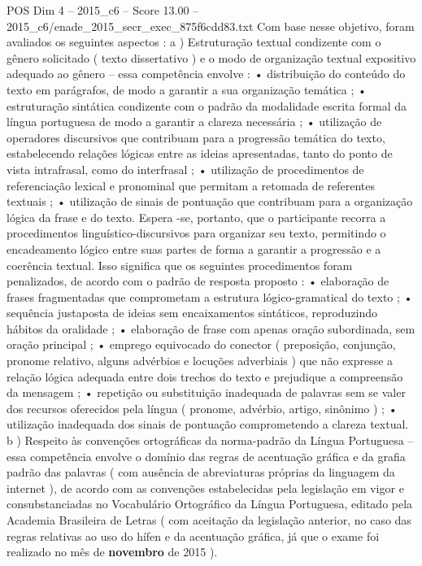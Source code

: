 \begin{textsample}{POS Dim 4 – 2015\_c6 – Score 13.00 – 2015\_c6/enade\_2015\_secr\_exec\_875f6cdd83.txt}
Com base nesse objetivo, foram avaliados os seguintes aspectos : a ) Estruturação textual condizente com o gênero solicitado ( texto dissertativo ) e o modo de organização textual expositivo adequado ao gênero – essa competência envolve : • distribuição do conteúdo do texto em parágrafos, de modo a garantir a sua organização temática ; • estruturação sintática condizente com o padrão da modalidade escrita formal da língua portuguesa de modo a garantir a clareza necessária ; • utilização de operadores discursivos que contribuam para a progressão temática do texto, estabelecendo relações lógicas entre as ideias apresentadas, tanto do ponto de vista intrafrasal, como do interfrasal ; • utilização de procedimentos de referenciação lexical e pronominal que permitam a retomada de referentes textuais ; • utilização de sinais de pontuação que contribuam para a organização lógica da frase e do texto.
Espera -se, portanto, que o participante recorra a procedimentos linguístico-discursivos para organizar seu texto, permitindo o encadeamento lógico entre suas partes de forma a garantir a progressão e a coerência textual.
Isso significa que os seguintes procedimentos foram penalizados, de acordo com o padrão de resposta proposto : • elaboração de frases fragmentadas que comprometam a estrutura lógico-gramatical do texto ; • sequência justaposta de ideias sem encaixamentos sintáticos, reproduzindo hábitos da oralidade ; • elaboração de frase com apenas oração subordinada, sem oração principal ; • emprego equivocado do conector ( preposição, conjunção, pronome relativo, alguns advérbios e locuções adverbiais ) que não expresse a relação lógica adequada entre dois trechos do texto e prejudique a compreensão da mensagem ; • repetição ou substituição inadequada de palavras sem se valer dos recursos oferecidos pela língua ( pronome, advérbio, artigo, sinônimo ) ; • utilização inadequada dos sinais de pontuação comprometendo a clareza textual. b ) Respeito às convenções ortográficas da norma-padrão da Língua Portuguesa – essa competência envolve o domínio das regras de acentuação gráfica e da grafia padrão das palavras ( com ausência de abreviaturas próprias da linguagem da internet ), de acordo com as convenções estabelecidas pela legislação em vigor e consubstanciadas no Vocabulário Ortográfico da Língua Portuguesa, editado pela Academia Brasileira de Letras ( com aceitação da legislação anterior, no caso das regras relativas ao uso do hífen e da acentuação gráfica, já que o exame foi realizado no mês de \textbf{novembro} de 2015 ).

\end{textsample}
